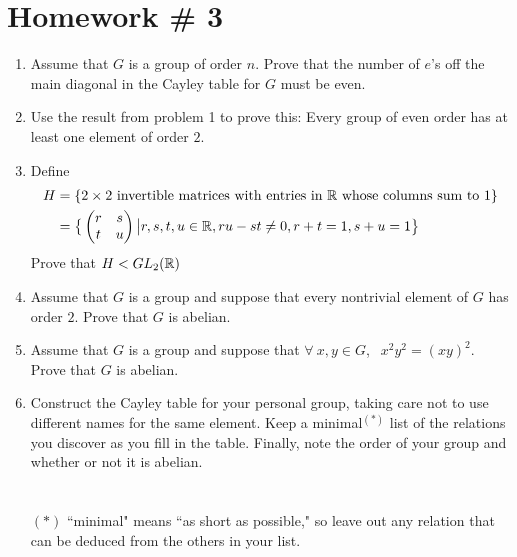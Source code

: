 \section*{Homework \# 3}
\begin{enumerate}
    \item Assume that $G$ is a group of order $n$. Prove that the number of $e$'s off the main diagonal in the Cayley table for $G$ must be even.
    \item Use the result from problem 1 to prove this: Every group of even order has at least one element of order $2$.
    \item Define
    \begin{align}
        H&= \{2\times 2 \text{ invertible matrices with entries in }{\mathbb{ R}}\text{ whose columns sum to }1\} \nonumber \\
        &= \big\{\begin{pmatrix}
            r&s\\t&u
        \end{pmatrix}\big | r,s,t,u \in {\mathbb{ R}}, ru-st\neq 0, r+t=1, s+u=1\big\} \nonumber
    \end{align}
    Prove that $H<GL_2({\mathbb{ R}})$
    \item Assume that $G$ is a group and suppose that every nontrivial element of $G$ has order $2$. Prove that $G$ is abelian.
    \item Assume that $G$ is a group and suppose that $\forall \ x,y \in G$, $\ \ x^2y^2=(xy)^2$. Prove that $G$ is abelian.
    \item Construct the Cayley table for your personal group, taking care not to use different names for the same element. Keep a minimal$^{(*)}$ list of the relations you discover as you fill in the table. Finally, note the order of your group and whether or not it is abelian. \\ \\ \\ $(*)$ ``minimal" means ``as short as possible," so leave out any relation that can be deduced from the others in your list.
\end{enumerate}
\newpage

